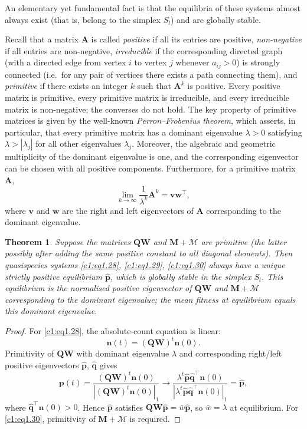 \documentclass[12pt]{report}
\newcommand{\bs}[1]{\bm{#1}}
\newtheorem{theorem}{Theorem}[section]
\theoremstyle{definition}
\theoremstyle{remark}
\begin{document}
An elementary yet fundamental fact is that the equilibria of these
systems almost always exist (that is, belong to the simplex $S_l$)
and are globally stable.

Recall that a matrix $\bs{A}$ is called \textit{positive} if all its
entries are positive, \textit{non-negative} if all entries are
non-negative, \textit{irreducible} if the corresponding directed
graph (with a directed edge from vertex $i$ to vertex $j$ whenever
$a_{ij}>0$) is strongly connected (i.e.\ for any pair of vertices
there exists a path connecting them), and \textit{primitive} if
there exists an integer $k$ such that $\bs{A}^k$ is positive. Every
positive matrix is primitive, every primitive matrix is irreducible,
and every irreducible matrix is non-negative; the converses do not
hold. The key property of primitive matrices is given by the
well-known \textit{Perron--Frobenius theorem}, which asserts, in
particular, that every primitive matrix has a dominant eigenvalue
$\lambda>0$ satisfying $\lambda>|\lambda_j|$ for all other
eigenvalues $\lambda_j$. Moreover, the algebraic and geometric
multiplicity of the dominant eigenvalue is one, and the
corresponding eigenvector can be chosen with all positive
components. Furthermore, for a primitive matrix $\bs{A}$,
\[
\lim_{k\to\infty}\frac{1}{\lambda^k}\bs{A}^k=\bs{v}\bs{w}^\top,
\]
where $\bs{v}$ and $\bs{w}$ are the right and left eigenvectors of
$\bs{A}$ corresponding to the dominant eigenvalue.

\begin{theorem}\label{c1:t1.2}
Suppose the matrices $\bs{QW}$ and $\bs{M}+\bs{\mathcal{M}}$ are
primitive (the latter possibly after adding the same positive constant
to all diagonal elements).  Then quasispecies systems \eqref{c1:eq1.28},
\eqref{c1:eq1.29}, \eqref{c1:eq1.30} always have a unique strictly positive
equilibrium $\hat{\bs{p}}$, which is globally stable in the simplex
$S_l$.  This equilibrium is the normalised positive eigenvector of
$\bs{QW}$ and $\bs{M}+\bs{\mathcal{M}}$ corresponding to the dominant
eigenvalue; the mean fitness at equilibrium equals this dominant
eigenvalue.
\end{theorem}

\begin{proof}
For \eqref{c1:eq1.28}, the absolute-count equation is linear:
$$\bs{n}(t)=(\bs{QW})^t\bs{n}(0).$$
  Primitivity of $\bs{QW}$
with dominant eigenvalue $\lambda$ and corresponding right/left
positive eigenvectors $\hat{\bs{p}}$, $\hat{\bs{q}}$ gives
\[
  \bs{p}(t)=\frac{(\bs{QW})^t\bs{n}(0)}{|(\bs{QW})^t\bs{n}(0)|_1}
  \to\frac{\lambda^t\hat{\bs{p}}\hat{\bs{q}}^{\top}\bs{n}(0)}
         {|\lambda^t\hat{\bs{p}}\hat{\bs{q}}^{\top}\bs{n}(0)|_1}
  =\hat{\bs{p}},
\]
where $\hat{\bs{q}}^{\top}\bs{n}(0)>0$.
Hence $\hat{\bs{p}}$ satisfies $\bs{QW}\hat{\bs{p}}=\bar{w}\hat{\bs{p}}$,
so $\bar{w}=\lambda$ at equilibrium.
For \eqref{c1:eq1.30}, primitivity of $\bs{M}+\bs{\mathcal{M}}$
is required. 
\end{proof}
\end{document}
